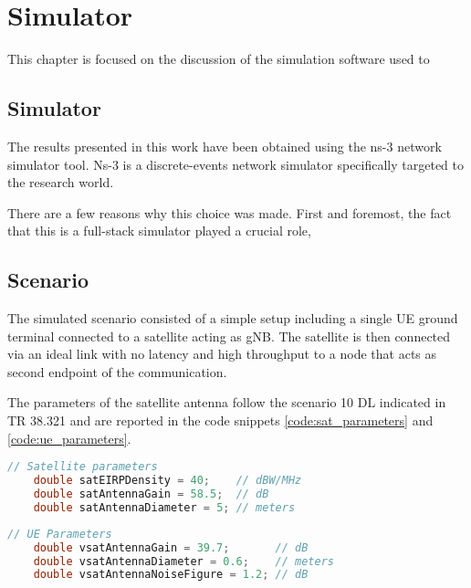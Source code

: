 
\chapter{Simulator}
\label{chp:simulator}

This chapter is focused on the discussion of the simulation software used to 
\section{Simulator}
The results presented in this work have been obtained using the ns-3 network simulator tool. Ns-3 is a discrete-events network simulator specifically targeted to the research world.

There are a few reasons why this choice was made. First and foremost, the fact that this is a full-stack simulator played a crucial role, 

\section{Scenario}
The simulated scenario consisted of a simple setup including a single \ac{UE} ground terminal connected to a satellite acting as \ac{gNB}. The satellite is then connected via an ideal link with no latency and high throughput to a node that acts as second endpoint of the communication.

The parameters of the satellite antenna follow the scenario 10 DL indicated in TR 38.321  and are reported in the code snippets \ref{code:sat_parameters} and \ref{code:ue_parameters}.

\begin{lstlisting}[language=C++, caption=Satellite antenna parameters, label=code:sat_parameters]
    // Satellite parameters
    double satEIRPDensity = 40;    // dBW/MHz
    double satAntennaGain = 58.5;  // dB
    double satAntennaDiameter = 5; // meters
\end{lstlisting}

\begin{lstlisting}[language=C++, caption=UE antenna parameters, label=code:ue_parameters]
    // UE Parameters
    double vsatAntennaGain = 39.7;       // dB
    double vsatAntennaDiameter = 0.6;    // meters
    double vsatAntennaNoiseFigure = 1.2; // dB 
\end{lstlisting}
